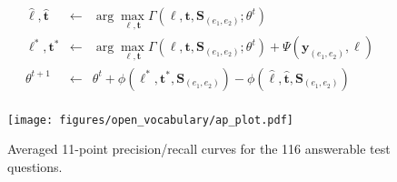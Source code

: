 \documentclass[11pt]{article}
\newcommand{\bS}{\textbf{S}}
\newcommand{\by}{\textbf{y}}
\newcommand{\bell}{\boldsymbol \ell}
\newcommand{\bt}{\textbf{t}}
\begin{document}
\begin{eqnarray*}
\hat{\bell}, \hat{\bt} & \leftarrow & \arg \max_{\bell, \bt} \Gamma(\bell, \bt , \bS{}_{(e_1, e_2)}; \theta^t) \\
\bell^*, \bt^* & \leftarrow & \arg \max_{\bell, \bt} \Gamma(\bell, \bt , \bS{}_{(e_1, e_2)}; \theta^t) + \Psi(\by_{(e_1, e_2)}, \bell) \\
\theta^{t+1} & \leftarrow & \theta^t + \phi(\bell^*, \bt^*, \bS{}_{(e_1, e_2)}) - \phi(\hat{\bell}, \hat{\bt}, \bS{}_{(e_1, e_2)}) \\
\end{eqnarray*}

\begin{figure}
\center
\texttt{[image: figures/open\_vocabulary/ap\_plot.pdf]}
\vspace{-1in}
\caption{Averaged 11-point precision/recall curves for the 116
  answerable test questions.}
\vspace{-.1in}
\label{fig:pr-curve}
\end{figure}
\end{document}
